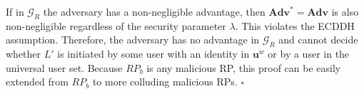 If in $\mathcal{G}_R$ the adversary has a non-negligible advantage, then $\mathbf{Adv}^*={\mathbf{Adv}}$ is also non-negligible regardless of the security parameter $\lambda$. This violates the ECDDH assumption.
 Therefore, the adversary has no advantage in $\mathcal{G}_R$ and cannot decide whether $L'$ is initiated by some user with an identity in $\mathbf{u}^w$ or by a user in the universal user set.
Because $RP_b$ is any malicious RP, this proof can be easily extended from $RP_b$ to more colluding malicious RPs.
\hfill $\square$


